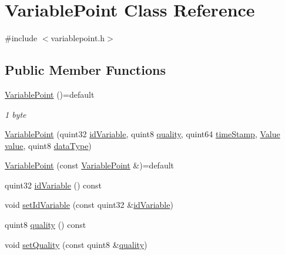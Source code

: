 \hypertarget{class_variable_point}{}\section{Variable\+Point Class Reference}
\label{class_variable_point}


{\ttfamily \#include $<$variablepoint.\+h$>$}

\subsection*{Public Member Functions}
\begin{DoxyCompactItemize}
\item 
\hyperlink{class_variable_point_ac911749e0343b1e121e130f59430f885}{Variable\+Point} ()=default
\begin{DoxyCompactList}\small\item\em 1 byte \end{DoxyCompactList}\item 
\hyperlink{class_variable_point_afa106e72508b8656cc13ea5fde1bfe3a}{Variable\+Point} (quint32 \hyperlink{class_variable_point_acf01c184bcc5fb38582a5a8595445207}{id\+Variable}, quint8 \hyperlink{class_variable_point_a0e155820d594f758ab0183743771ffa1}{quality}, quint64 \hyperlink{class_variable_point_add236ae653ac63bfa9bada86622b2c01}{time\+Stamp}, \hyperlink{union_value}{Value} \hyperlink{class_variable_point_ad252ddf53853270468fe6740780921b4}{value}, quint8 \hyperlink{class_variable_point_ac77cda8d3772f2f84c9e93f25e995ec9}{data\+Type})
\item 
\hyperlink{class_variable_point_aa87da44dd800ae8bf0e3db4027cbbf3e}{Variable\+Point} (const \hyperlink{class_variable_point}{Variable\+Point} \&)=default
\item 
quint32 \hyperlink{class_variable_point_acf01c184bcc5fb38582a5a8595445207}{id\+Variable} () const 
\item 
void \hyperlink{class_variable_point_aad26118589a6438206c763b9985451c0}{set\+Id\+Variable} (const quint32 \&\hyperlink{class_variable_point_acf01c184bcc5fb38582a5a8595445207}{id\+Variable})
\item 
quint8 \hyperlink{class_variable_point_a0e155820d594f758ab0183743771ffa1}{quality} () const 
\item 
void \hyperlink{class_variable_point_adf883541fda5f85c80918094585d5e14}{set\+Quality} (const quint8 \&\hyperlink{class_variable_point_a0e155820d594f758ab0183743771ffa1}{quality})
\item 

\end{DoxyCompactItemize}
